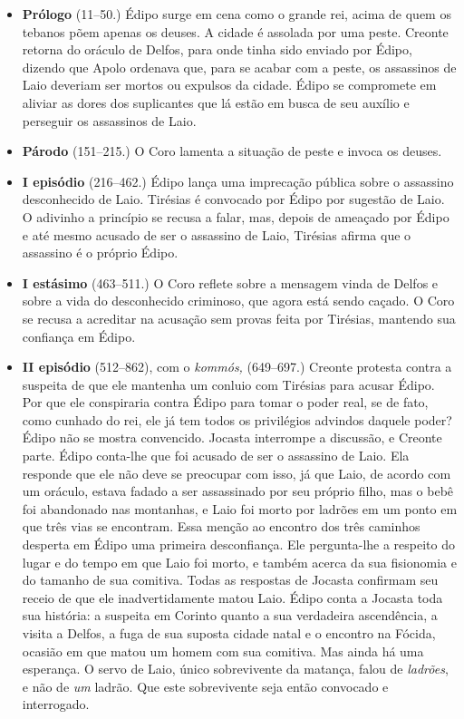 \begin{itemize}
\item \textbf{Prólogo} (11--50.) Édipo surge em cena como o
grande rei, acima de quem os tebanos põem apenas os deuses. A cidade é
assolada por uma peste. Creonte retorna do oráculo de Delfos, para onde
tinha sido enviado por Édipo, dizendo que Apolo ordenava que, para se
acabar com a peste, os assassinos de Laio deveriam ser mortos ou
expulsos da cidade. Édipo se compromete em aliviar as dores dos
suplicantes que lá estão em busca de seu auxílio e perseguir os
assassinos de Laio.

\item \textbf{Párodo} (151--215.) O Coro lamenta a situação
de peste e invoca os deuses.

\item \textbf{I episódio} (216--462.) Édipo lança uma
imprecação pública sobre o assassino desconhecido de Laio. Tirésias é
convocado por Édipo por sugestão de Laio. O adivinho a princípio se
recusa a falar, mas, depois de ameaçado por Édipo e até mesmo acusado de
ser o assassino de Laio, Tirésias afirma que o assassino é o próprio
Édipo.

\item \textbf{I estásimo} (463--511.) O Coro reflete sobre a
mensagem vinda de Delfos e sobre a vida do desconhecido criminoso, que
agora está sendo caçado. O Coro se recusa a acreditar na acusação sem
provas feita por Tirésias, mantendo sua confiança em Édipo.

\item \textbf{II episódio} (512--862), com o \emph{kommós,} (649--697.) 
Creonte protesta contra a suspeita de que ele mantenha um
conluio com Tirésias para acusar Édipo. Por que ele conspiraria contra
Édipo para tomar o poder real, se de fato, como cunhado do rei, ele já
tem todos os privilégios advindos daquele poder? Édipo não se mostra
convencido. Jocasta interrompe a discussão, e Creonte parte. Édipo
conta-lhe que foi acusado de ser o assassino de Laio. Ela responde que
ele não deve se preocupar com isso, já que Laio, de acordo com um
oráculo, estava fadado a ser assassinado por seu próprio filho, mas o
bebê foi abandonado nas montanhas, e Laio foi morto por ladrões em um
ponto em que três vias se encontram. Essa menção ao encontro dos três
caminhos desperta em Édipo uma primeira desconfiança. Ele pergunta-lhe a
respeito do lugar e do tempo em que Laio foi morto, e também acerca da
sua fisionomia e do tamanho de sua comitiva. Todas as respostas de
Jocasta confirmam seu receio de que ele inadvertidamente matou Laio.
Édipo conta a Jocasta toda sua história: a suspeita em Corinto quanto a
sua verdadeira ascendência, a visita a Delfos, a fuga de sua suposta
cidade natal e o encontro na Fócida, ocasião em que matou um homem com
sua comitiva. Mas ainda há uma esperança. O servo de Laio, único
sobrevivente da matança, falou de \emph{ladrões}, e não de \emph{um}
ladrão. Que este sobrevivente seja então convocado e interrogado.


\end{itemize}
